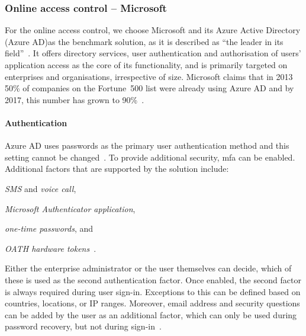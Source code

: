 \subsubsection{Online access control -- Microsoft}\label{sec:online-access-control}

For the online access control, we choose Microsoft and its Azure Active Directory (Azure AD)\footnotemark as the benchmark solution, as it is described as ``the leader in its field''~\cite{Kreizman2018MagicWorldwide}. It offers directory services, user authentication and authorisation of users' application access as the core of its functionality, and is primarily targeted on enterprises and organisations, irrespective of size. Microsoft claims that in 2013 50\% of companies on the Fortune~500 list were already using Azure AD and by 2017, this number has grown to 90\%~\cite{Martin201350Azure}.


\paragraph{Authentication} Azure AD uses passwords as the primary user authentication method and this setting cannot be changed~\cite{Flores2019AuthenticationMethods}. To provide additional security, \acrlong{mfa} can be enabled. Additional factors that are supported by the solution include:
\begin{enumerate*}[label=(\roman*)]
    \item \textit{SMS} and \textit{voice call},
    \item \textit{Microsoft Authenticator application},
    \item \textit{one-time passwords}, and 
    \item \textit{OATH hardware tokens}\footnotemark~\cite{Flores2019AuthenticationMethods}.
\end{enumerate*}

Either the enterprise administrator or the user themselves can decide, which of these is used as the second authentication factor. Once enabled, the second factor is always required during user sign-in. Exceptions to this can be defined based on countries, locations, or IP ranges. Moreover, email address and security questions can be added by the user as an additional factor, which can only be used during password recovery, but not during sign-in~\cite{eross-msft2018ConfigureAuthentication}.

